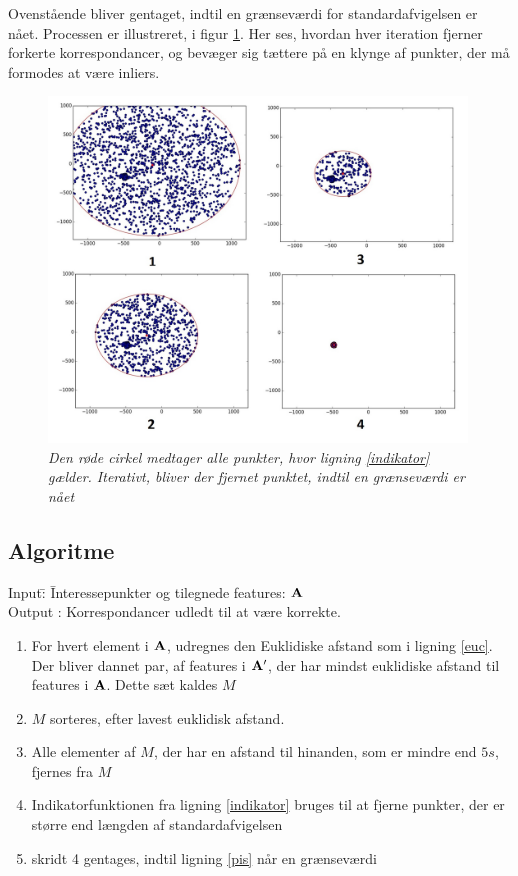 Ovenstående bliver gentaget, indtil en grænseværdi for standardafvigelsen er nået. Processen er illustreret, i figur \ref{fig:tilmatching}. Her ses, hvordan hver iteration fjerner forkerte korrespondancer, og bevæger sig tættere på en klynge af punkter, der må formodes at være inliers.
\begin{figure}[H]
    \centering
    \includegraphics[width=0.99\textwidth]{fig/tilmatching.jpg}
     \vspace{-0.5em}
    \begin{center}    
       \caption{{\footnotesize \textit{Den røde cirkel medtager alle punkter, hvor ligning \eqref{indikator} gælder. Iterativt, bliver der fjernet punktet, indtil en grænseværdi er nået}}}
    \label{fig:tilmatching}
     \end{center}
     \vspace{-2.5em}
  \end{figure} \noindent

\subsection*{Algoritme}
\begin{tabbing}
Input\quad \= : \= Interessepunkter og tilegnede features: $\bold{A}$\\
Output \text{ } \> : \> Korrespondancer udledt til at være korrekte.
\end{tabbing}
\begin{enumerate}
\item{For hvert element i $\bold{A}$, udregnes den Euklidiske afstand som i ligning \eqref{euc}. Der bliver dannet par, af features i $\bold{A}'$, der har mindst euklidiske afstand til features i $\bold{A}$. Dette sæt kaldes $M$}
\item{$M$ sorteres, efter lavest euklidisk afstand.}
\item{Alle elementer af $M$, der har en afstand til hinanden, som er mindre end $5s$, fjernes fra $M$}
\item{Indikatorfunktionen fra ligning \eqref{indikator} bruges til at fjerne punkter, der er større end længden af standardafvigelsen}
\item{skridt 4 gentages, indtil ligning \eqref{pis} når en grænseværdi}
\end{enumerate}